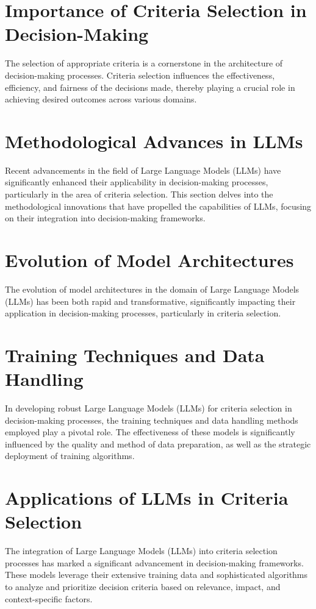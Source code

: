 \documentclass{article}
\begin{document}
\section{Importance of Criteria Selection in Decision-Making}
The selection of appropriate criteria is a cornerstone in the architecture of decision-making processes. Criteria selection influences the effectiveness, efficiency, and fairness of the decisions made, thereby playing a crucial role in achieving desired outcomes across various domains.

\section{Methodological Advances in LLMs}
Recent advancements in the field of Large Language Models (LLMs) have significantly enhanced their applicability in decision-making processes, particularly in the area of criteria selection. This section delves into the methodological innovations that have propelled the capabilities of LLMs, focusing on their integration into decision-making frameworks.

\section{Evolution of Model Architectures}
The evolution of model architectures in the domain of Large Language Models (LLMs) has been both rapid and transformative, significantly impacting their application in decision-making processes, particularly in criteria selection.

\section{Training Techniques and Data Handling}
In developing robust Large Language Models (LLMs) for criteria selection in decision-making processes, the training techniques and data handling methods employed play a pivotal role. The effectiveness of these models is significantly influenced by the quality and method of data preparation, as well as the strategic deployment of training algorithms.

\section{Applications of LLMs in Criteria Selection}
The integration of Large Language Models (LLMs) into criteria selection processes has marked a significant advancement in decision-making frameworks. These models leverage their extensive training data and sophisticated algorithms to analyze and prioritize decision criteria based on relevance, impact, and context-specific factors.
\end{document}
